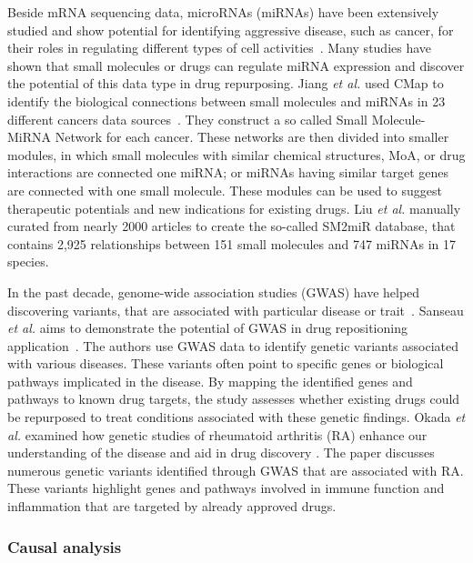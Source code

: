Beside mRNA sequencing data, microRNAs (miRNAs) have been extensively studied and show potential for identifying aggressive disease, such as cancer, for their roles in regulating different types of cell activities~\cite{ding2014micrornas, wen2014micrornas}. Many studies have shown that small molecules or drugs can regulate miRNA expression and discover the potential of this data type in drug repurposing.
Jiang \textit{et al.} used CMap to identify the biological connections between small
molecules and miRNAs in 23 different cancers data sources~\cite{jiang2012identification}. They construct a so called Small Molecule-MiRNA Network for each cancer. These networks are then divided into smaller modules, in which small molecules with similar chemical structures, MoA, or drug interactions are connected one miRNA; or miRNAs having similar target genes are connected with one small molecule. These modules can be used to suggest therapeutic potentials and new indications for existing drugs.
Liu \textit{et al.} \cite{liu2013sm2mir} manually curated from nearly 2000 articles to create the so-called SM2miR database, that contains 2,925 relationships between 151 small molecules and 747 miRNAs in 17 species.

In the past decade, genome-wide association studies (GWAS) have helped discovering variants, that are associated with particular disease or trait~\cite{visscher2012five, hebbring2014challenges}. Sanseau \textit{et al.} aims to demonstrate the potential of GWAS in drug repositioning application~\cite{sanseau2012use}. The authors use GWAS data to identify genetic variants associated with various diseases. These variants often point to specific genes or biological pathways implicated in the disease. By mapping the identified genes and pathways to known drug targets, the study assesses whether existing drugs could be repurposed to treat conditions associated with these genetic findings. Okada \textit{et al.} examined how genetic studies of rheumatoid arthritis (RA) enhance our understanding of the disease and aid in drug discovery \cite{okada2014genetics}. The paper discusses numerous genetic variants identified through GWAS that are associated with RA. These variants highlight genes and pathways involved in immune function and inflammation that are targeted by already approved drugs.


\subsubsection{Causal analysis}

